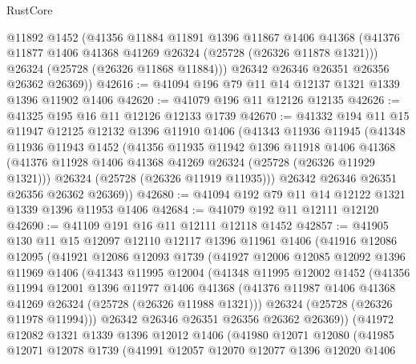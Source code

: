 \begin{lexlean}{RustCore}
\begin{coremodule}
        @11892
        @1452
        (@41356
          @11884
          @11891
          @1396
          @11867
          @1406
          @41368
          (@41376 @11877 @1406 @41368 @41269 @26324 (@25728 (@26326 @11878 @1321)))
          @26324
          (@25728 (@26326 @11868 @11884)))
        @26342
        @26346
        @26351
        @26356
        @26362
        @26369))
@42616 := @41094 @196 @79 @11 @14 @12137 @1321 @1339 @1396 @11902 @1406
@42620 := @41079 @196 @11 @12126 @12135
@42626 := @41325 @195 @16 @11 @12126 @12133 @1739
@42670 := @41332
    @194
    @11
    @15
    @11947
    @12125
    @12132
    @1396
    @11910
    @1406
    (@41343
      @11936
      @11945
      (@41348
        @11936
        @11943
        @1452
        (@41356
          @11935
          @11942
          @1396
          @11918
          @1406
          @41368
          (@41376 @11928 @1406 @41368 @41269 @26324 (@25728 (@26326 @11929 @1321)))
          @26324
          (@25728 (@26326 @11919 @11935)))
        @26342
        @26346
        @26351
        @26356
        @26362
        @26369))
@42680 := @41094 @192 @79 @11 @14 @12122 @1321 @1339 @1396 @11953 @1406
@42684 := @41079 @192 @11 @12111 @12120
@42690 := @41109 @191 @16 @11 @12111 @12118 @1452
@42857 := @41905
    @130
    @11
    @15
    @12097
    @12110
    @12117
    @1396
    @11961
    @1406
    (@41916
      @12086
      @12095
      (@41921
        @12086
        @12093
        @1739
        (@41927
          @12006
          @12085
          @12092
          @1396
          @11969
          @1406
          (@41343
            @11995
            @12004
            (@41348
              @11995
              @12002
              @1452
              (@41356
                @11994
                @12001
                @1396
                @11977
                @1406
                @41368
                (@41376 @11987 @1406 @41368 @41269 @26324 (@25728 (@26326 @11988 @1321)))
                @26324
                (@25728 (@26326 @11978 @11994)))
              @26342
              @26346
              @26351
              @26356
              @26362
              @26369))
          (@41972
            @12082
            @1321
            @1339
            @1396
            @12012
            @1406
            (@41980
              @12071
              @12080
              (@41985
                @12071
                @12078
                @1739
                (@41991
                  @12057
                  @12070
                  @12077
                  @1396
                  @12020
                  @1406

\end{coremodule}
\end{lexlean}
